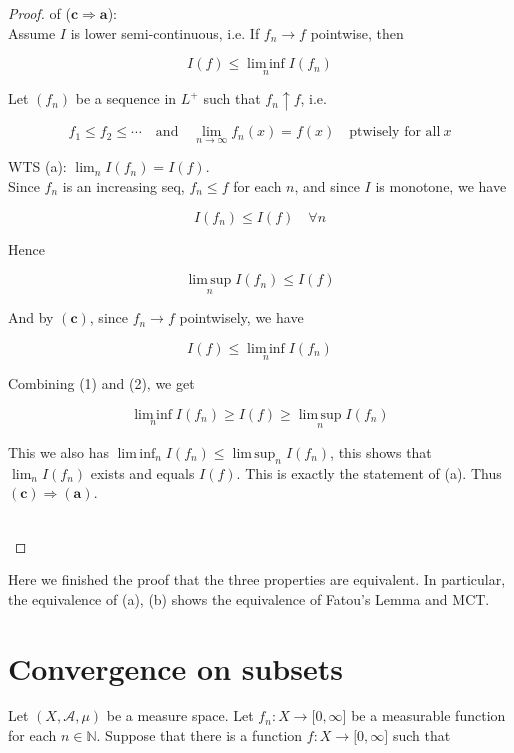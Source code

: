 \begin{proof}

of (\(\mathbf{c}\Longrightarrow\mathbf{a}\)):\\
Assume \(I\) is lower semi-continuous, i.e. If \(f_{n}\rightarrow f\) pointwise, then

\[I(f) \leq \operatorname{lim\, inf}\limits_{n}I(f_{n})\]

Let \((f_{n})\) be a sequence in \(L^{+}\) such that \(f_{n} \uparrow f\), i.e.

\[f_{1} \leq f_{2} \leq \cdots\quad\text{and}\quad\lim\limits_{n\rightarrow\infty}f_{n}(x) = f(x)\quad\text{ptwisely for all}\ x\]

WTS (a): \(\lim_{n}I(f_{n}) = I(f)\).\\
Since \(f_{n}\) is an increasing seq, \(f_{n} \leq f\) for each \(n\), and since \(I\) is monotone, we have

\[I(f_{n}) \leq I(f)\quad\forall n\]

Hence

\[\operatorname{lim\, sup}\limits_{n}I(f_{n}) \leq I(f)\]

And by \((\mathbf{c})\), since \(f_{n}\rightarrow f\) pointwisely, we have

\[I(f) \leq \operatorname{lim\, inf}\limits_{n}I(f_{n})\]

Combining (1) and (2), we get

\[\operatorname{lim\, inf}\limits_{n}I(f_{n}) \geq I(f) \geq \operatorname{lim\, sup}\limits_{n}I(f_{n})\]

This we also has \(\operatorname{lim\, inf}_{n}I(f_{n}) \leq \operatorname{lim\, sup}_{n}I(f_{n})\), this shows that \(\lim_{n}I(f_{n})\) exists and equals \(I(f)\). This is exactly the statement of (a). Thus \((\mathbf{c})\Longrightarrow(\mathbf{a})\).\\
\strut \\

\end{proof}

Here we finished the proof that the three properties are equivalent. In particular, the equivalence of (a), (b) shows the equivalence of Fatou's Lemma and MCT.

\section{Convergence on subsets}\label{convergence-on-subsets}

Let \((X,\mathcal{A},\mu)\) be a measure space. Let \(f_{n}:X\rightarrow\lbrack 0,\infty\rbrack\) be a measurable function for each \(n \in \mathbb{N}\). Suppose that there is a function \(f:X\rightarrow\lbrack 0,\infty\rbrack\) such that

